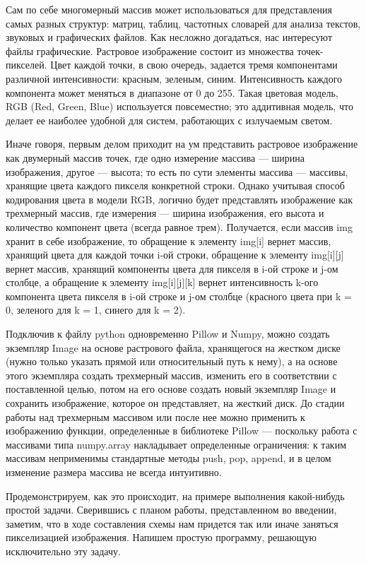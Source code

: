 \documentclass[12pt]{article}
\begin{document}
{	Сам по себе многомерный массив может использоваться для представления самых разных структур: матриц, таблиц, частотных словарей для анализа текстов, звуковых и графических файлов. Как несложно догадаться, нас интересуют файлы графические. Растровое изображение состоит из множества точек-пикселей. Цвет каждой точки, в свою очередь, задается тремя компонентами различной интенсивности: красным, зеленым, синим. Интенсивность каждого компонента может меняться в диапазоне от 0 до 255. Такая цветовая модель, RGB (Red, Green, Blue) используется повсеместно; это аддитивная модель, что делает ее наиболее удобной для систем, работающих с излучаемым светом.
	
	Иначе говоря, первым делом приходит на ум представить растровое изображение как двумерный массив точек, где одно измерение массива --- ширина изображения, другое --- высота; то есть по сути элементы массива --- массивы, хранящие цвета каждого пикселя конкретной строки. Однако учитывая способ кодирования цвета в модели RGB, логично будет представлять изображение как трехмерный массив, где измерения --- ширина изображения, его высота и количество компонент цвета (всегда равное трем). Получается, если массив img хранит в себе изображение, то обращение к элементу img[i] вернет массив, хранящий цвета для каждой точки i-ой строки, обращение к элементу img[i][j] вернет массив, хранящий компоненты цвета для пикселя в i-ой строке и j-ом столбце, а обращение к элементу img[i][j][k] вернет интенсивность k-ого компонента цвета пикселя в i-ой строке и j-ом столбце (красного цвета при k = 0, зеленого для k = 1, синего для k = 2).
	
	Подключив к файлу python одновременно Pillow и Numpy, можно создать экземпляр Image на основе растрового файла, хранящегося на жестком диске (нужно только указать прямой или относительный путь к нему), а на основе этого экземпляра создать трехмерный массив, изменить его в соответствии с поставленной целью, потом на его основе создать новый экземпляр Image и сохранить изображение, которое он представляет, на жесткий диск. До стадии работы над трехмерным массивом или после нее можно применить к изображению функции, определенные в библиотеке Pillow --- поскольку работа с массивами типа numpy.array накладывает определенные ограничения: к таким массивам неприменимы стандартные методы push, pop, append, и в целом изменение размера массива не всегда интуитивно.
	
	Продемонстрируем, как это происходит, на примере выполнения какой-нибудь простой задачи. Сверившись с планом работы, представленном во введении, заметим, что в ходе составления схемы нам придется так или иначе заняться пикселизацией изображения. Напишем простую программу, решающую исключительно эту задачу.
	
}
\end{document}
